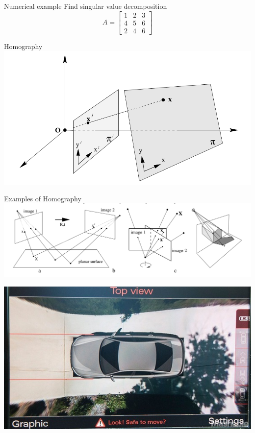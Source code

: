 \documentclass[times,t]{beamer}
\begin{document}
\begin{frame}{Numerical example}
  Find singular value decomposition
  \[
    A   =  \begin{bmatrix}
      1 &   2  &  3  \\
      4 & 5 &   6 \\
      2 & 4 &   6
    \end{bmatrix}
  \]
\end{frame}

\begin{frame}{Homography}
  \includegraphics[width=\linewidth]{media/homography-maps-a-line-to-a-line.png}
\end{frame}
\begin{frame}{Examples  of  Homography}
  \includegraphics[width=\linewidth]{media/examples-of-homography.png}
\end{frame}

\begin{frame}
  \includegraphics[width=0.60\linewidth]{media/audi top view camera.jpg}
\end{frame}
\end{document}
